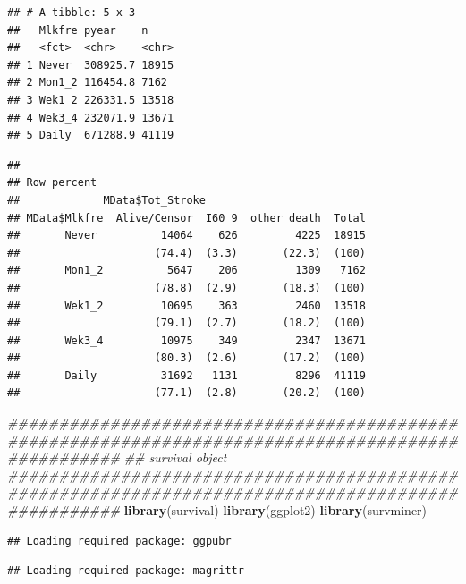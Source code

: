 \documentclass[]{article}
\newenvironment{Shaded}{\begin{snugshade}}{\end{snugshade}}
\newcommand{\CommentTok}[1]{\textcolor[rgb]{0.56,0.35,0.01}{\textit{#1}}}
\newcommand{\DataTypeTok}[1]{\textcolor[rgb]{0.13,0.29,0.53}{#1}}
\newcommand{\KeywordTok}[1]{\textcolor[rgb]{0.13,0.29,0.53}{\textbf{#1}}}
\newcommand{\NormalTok}[1]{#1}
\newcommand{\OperatorTok}[1]{\textcolor[rgb]{0.81,0.36,0.00}{\textbf{#1}}}
\newcommand{\OtherTok}[1]{\textcolor[rgb]{0.56,0.35,0.01}{#1}}
\newcommand{\StringTok}[1]{\textcolor[rgb]{0.31,0.60,0.02}{#1}}
\begin{document}
\begin{verbatim}
## # A tibble: 5 x 3
##   Mlkfre pyear    n    
##   <fct>  <chr>    <chr>
## 1 Never  308925.7 18915
## 2 Mon1_2 116454.8 7162 
## 3 Wek1_2 226331.5 13518
## 4 Wek3_4 232071.9 13671
## 5 Daily  671288.9 41119
\end{verbatim}

\begin{Shaded}
\end{Shaded}

\begin{verbatim}
## 
## Row percent 
##             MData$Tot_Stroke
## MData$Mlkfre  Alive/Censor  I60_9  other_death  Total
##       Never          14064    626         4225  18915
##                     (74.4)  (3.3)       (22.3)  (100)
##       Mon1_2          5647    206         1309   7162
##                     (78.8)  (2.9)       (18.3)  (100)
##       Wek1_2         10695    363         2460  13518
##                     (79.1)  (2.7)       (18.2)  (100)
##       Wek3_4         10975    349         2347  13671
##                     (80.3)  (2.6)       (17.2)  (100)
##       Daily          31692   1131         8296  41119
##                     (77.1)  (2.8)       (20.2)  (100)
\end{verbatim}

\begin{Shaded}
\begin{Highlighting}[]
\CommentTok{###################################################################################################}
\CommentTok{## survival object}
\CommentTok{###################################################################################################}
\KeywordTok{library}\NormalTok{(survival)}
\KeywordTok{library}\NormalTok{(ggplot2)}
\KeywordTok{library}\NormalTok{(survminer)}
\end{Highlighting}
\end{Shaded}

\begin{verbatim}
## Loading required package: ggpubr
\end{verbatim}

\begin{verbatim}
## Loading required package: magrittr
\end{verbatim}
\end{document}
